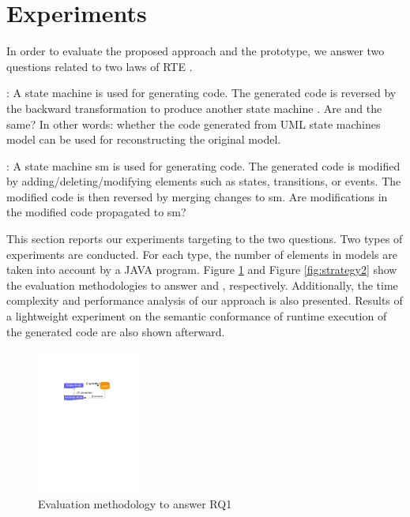 \section{Experiments}
\label{sec:experiments}
In order to evaluate the proposed approach and the prototype, we answer two questions related to two laws of RTE \cite{foster_combinators_2007}. 

: A state machine  is used for generating code. The generated code is reversed by the backward transformation to produce another state machine . Are  and  the same? In other words: whether the code generated from UML state machines model can be used for reconstructing the original model.

: A state machine sm is used for generating code. The generated code is modified by adding/deleting/modifying elements such as states, transitions, or events. The modified code is then reversed by merging changes to sm. Are modifications in the modified code propagated to sm?

This section reports our experiments targeting to the two questions. Two types of experiments are conducted. For each type, the number of elements in models are taken into account by a JAVA program. Figure \ref{fig:strategy1} and Figure \ref{fig:strategy2} show the evaluation methodologies to answer  and , respectively. Additionally, the time complexity and performance analysis of our approach is also presented. Results of a lightweight experiment on the semantic conformance of runtime execution of the generated code are also shown afterward.

\begin{figure}
\centering
\includegraphics[clip, trim=5.5cm 19cm 5.5cm 6cm, width=0.3\textwidth]{figures/strategy1}
\caption{Evaluation methodology to answer RQ1} 
\label{fig:strategy1}
\end{figure}

